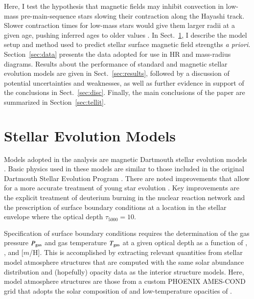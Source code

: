 \documentclass{aa}
\begin{document}
Here, I test the hypothesis that magnetic fields may inhibit convection in low-mass pre-main-sequence stars slowing their contraction along the Hayashi track. Slower contraction times for low-mass stars would give them larger radii at a given age, pushing inferred ages to older values \citep[e.g.,][]{MM10, Malo2014}.  
In Sect.~\ref{sec:models}, I describe the model setup and method used to predict stellar surface magnetic field strengths \emph{a priori}. Section~\ref{sec:data} presents the data adopted for use in HR and mass-radius diagrams. Results about the performance of standard and magnetic stellar evolution models are given in Sect.~\ref{sec:results}, followed by  a discussion of potential uncertainties and weaknesses, as well as further evidence in support of the conclusions in Sect.~\ref{sec:disc}. Finally, the main conclusions of the paper are summarized in Section~\ref{sec:tellit}.


\section{Stellar Evolution Models}
\label{sec:models}
Models adopted in the analysis are magnetic Dartmouth stellar evolution models \citep{FC12b}. Basic physics used in these models are similar to those included in the original Dartmouth Stellar Evolution Program \citep[DSEP;][]{Dotter2008}. There are noted improvements that allow for a more accurate treatment of young star evolution \citep[see, e.g.,][]{Malo2014}. Key improvements are the explicit treatment of deuterium burning in the nuclear reaction network and the prescription of surface boundary conditions at a location in the stellar envelope where the optical depth $\tau_{5000} = 10$. 

Specification of surface boundary conditions requires the determination of the gas pressure $P_{\rm gas}$ and gas temperature $T_{\rm gas}$ at a given optical depth as a function of \logg, \teff, and [$m$/H]. This is accomplished by extracting relevant quantities from stellar model atmosphere structures that are computed with the same solar abundance distribution and (hopefully) opacity data as the interior structure models. Here, model atmosphere structures are those from a custom PHOENIX AMES-COND grid \citep{Hauschildt1999a, Hauschildt1999b, Dotter2008} that adopts the solar composition of \citet{GS98} and low-temperature opacities of \citet{Ferguson2005}.
\end{document}
